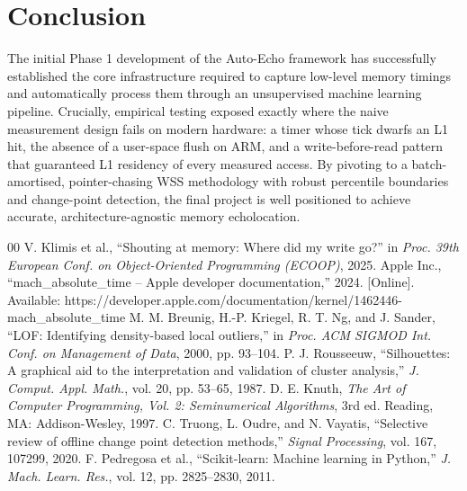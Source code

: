 \documentclass[conference]{IEEEtran}
\begin{document}
\section{Conclusion}
The initial Phase 1 development of the Auto-Echo framework has successfully established the core infrastructure required to capture low-level memory timings and automatically process them through an unsupervised machine learning pipeline. Crucially, empirical testing exposed exactly where the naive measurement design fails on modern hardware: a timer whose tick dwarfs an L1 hit, the absence of a user-space flush on ARM, and a write-before-read pattern that guaranteed L1 residency of every measured access. By pivoting to a batch-amortised, pointer-chasing WSS methodology with robust percentile boundaries and change-point detection, the final project is well positioned to achieve accurate, architecture-agnostic memory echolocation.

\begin{thebibliography}{00}
 V. Klimis et al., ``Shouting at memory: Where did my write go?'' in \textit{Proc. 39th European Conf. on Object-Oriented Programming (ECOOP)}, 2025.
 Apple Inc., ``mach\_absolute\_time -- Apple developer documentation,'' 2024. [Online]. Available: https://developer.apple.com/documentation/kernel/1462446-mach\_absolute\_time
 M. M. Breunig, H.-P. Kriegel, R. T. Ng, and J. Sander, ``LOF: Identifying density-based local outliers,'' in \textit{Proc. ACM SIGMOD Int. Conf. on Management of Data}, 2000, pp. 93--104.
 P. J. Rousseeuw, ``Silhouettes: A graphical aid to the interpretation and validation of cluster analysis,'' \textit{J. Comput. Appl. Math.}, vol. 20, pp. 53--65, 1987.
 D. E. Knuth, \textit{The Art of Computer Programming, Vol. 2: Seminumerical Algorithms}, 3rd ed. Reading, MA: Addison-Wesley, 1997.
 C. Truong, L. Oudre, and N. Vayatis, ``Selective review of offline change point detection methods,'' \textit{Signal Processing}, vol. 167, 107299, 2020.
 F. Pedregosa et al., ``Scikit-learn: Machine learning in Python,'' \textit{J. Mach. Learn. Res.}, vol. 12, pp. 2825--2830, 2011.
\end{thebibliography}
\end{document}
